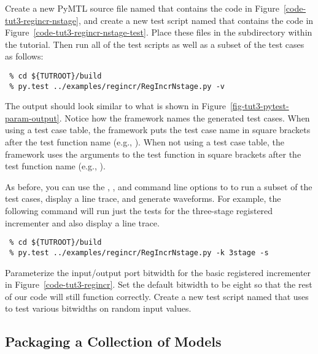 \documentclass{cbxdoc}
\begin{document}
Create a new PyMTL source file named  that contains
the code in Figure~\ref{code-tut3-regincr-nstage}, and create a new test
script named  that contains the code in
Figure~\ref{code-tut3-regincr-nstage-test}. Place these files in the
 subdirectory within the tutorial. Then run all of
the test scripts as well as a subset of the test cases as follows:

\begin{verbatim}
 % cd ${TUTROOT}/build
 % py.test ../examples/regincr/RegIncrNstage.py -v
\end{verbatim}



The output should look similar to what is shown in
Figure~\ref{fig-tut3-pytest-param-output}. Notice how the 
framework names the generated test cases. When using a test case table,
the  framework puts the test case name in square brackets
after the test function name (e.g., ). When not
using a test case table, the  framework uses the arguments to
the test function in square brackets after the test function name (e.g.,
).

As before, you can use the , , and 
command line options to  to run a subset of the test cases,
display a line trace, and generate waveforms. For example, the following
command will run just the tests for the three-stage registered
incrementer and also display a line trace.

\begin{verbatim}
 % cd ${TUTROOT}/build
 % py.test ../examples/regincr/RegIncrNstage.py -k 3stage -s
\end{verbatim}

\begin{task}
  Parameterize the input/output port bitwidth for the basic registered
  incrementer in Figure~\ref{code-tut3-regincr}. Set the default bitwidth
  to be eight so that the rest of our code will still function correctly.
  Create a new test script named  that uses
   to test various bitwidths on random input
  values.
\end{task}

\subsection{Packaging a Collection of Models}
\end{document}
